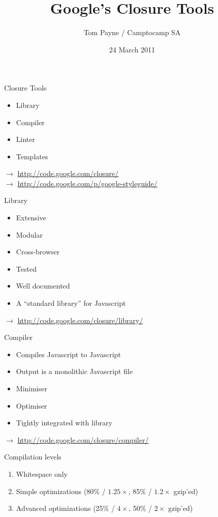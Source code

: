 \documentclass{powerdot}
\title{Google's Closure Tools}
\author{Tom Payne / Camptocamp SA}
\date{24 March 2011}
\begin{document}
\newcommand{\code}[1]{{\small\texttt{#1}}}
\newcommand{\link}[1]{{\small$\rightarrow$ \href{#1}{#1}}}

\maketitle

\begin{slide}{Closure Tools}
\begin{itemize}
\item Library
\item Compiler
\item Linter
\item Templates
\end{itemize}
\link{http://code.google.com/closure/} \\
\link{http://code.google.com/p/google-styleguide/}
\end{slide}

\begin{slide}{Library}
\begin{itemize}
\item Extensive
\item Modular
\item Cross-browser
\item Tested
\item Well documented
\item A ``standard library'' for Javascript
\end{itemize}
\link{http://code.google.com/closure/library/}
\end{slide}

\begin{slide}{Compiler}
\begin{itemize}
\item Compiles Javascript to Javascript
\item Output is a monolithic Javascript file
\item Minimiser
\item Optimiser
\item Tightly integrated with library
\end{itemize}
\link{http://code.google.com/closure/compiler/}
\end{slide}

\begin{slide}{Compilation levels}
\begin{enumerate}
\item Whitespace only
\item Simple optimizations (80\% / $1.25\times$, 85\% / $1.2\times$ gzip'ed)
\item Advanced optimizations (25\% / $4\times$, 50\% / $2\times$ gzip'ed)
\end{enumerate}
\end{slide}
\end{document}
